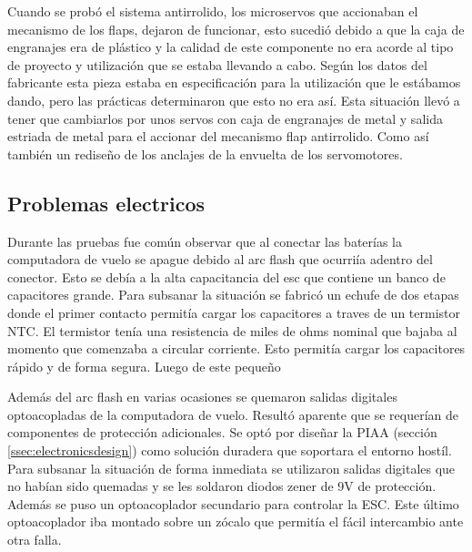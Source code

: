 \medskip

Cuando se probó el sistema antirrolido, los microservos que accionaban el mecanismo de los flaps, dejaron de funcionar, esto sucedió debido a que la caja de engranajes era de plástico y la calidad de este componente no era acorde al tipo de proyecto y utilización que se estaba llevando a cabo. Según los datos del fabricante esta pieza estaba en especificación para la utilización que le estábamos dando, pero las prácticas determinaron que esto no era así. Esta situación llevó a tener que cambiarlos por unos servos con caja de engranajes de metal y salida estriada de metal para el accionar del mecanismo flap antirrolido. Como así también un rediseño de los anclajes de la envuelta de los servomotores.

\subsection{Problemas electricos}
Durante las pruebas fue común observar que al conectar las baterías la computadora de vuelo se apague debido al arc flash que ocurriía adentro del conector. Esto se debía a la alta capacitancia
del \gls{esc} que contiene un banco de capacitores grande. Para subsanar la situación se fabricó un echufe de dos etapas donde el primer contacto permitía cargar los capacitores a traves de un termistor NTC. El termistor tenía una resistencia de miles de ohms nominal que bajaba al momento que comenzaba a circular corriente. Esto permitía cargar los capacitores rápido y de forma segura. Luego de este pequeño

Además del arc flash en varias ocasiones se quemaron salidas digitales optoacopladas de la computadora de vuelo. Resultó aparente que se requerían de componentes de protección adicionales.
Se optó por diseñar la PIAA (sección \ref{ssec:electronicsdesign}) como solución duradera que soportara el entorno hostíl. Para subsanar la situación de forma inmediata se utilizaron salidas digitales que no habían sido quemadas y se les soldaron diodos zener de 9V de protección. Además se puso un optoacoplador secundario para controlar la ESC. Este último optoacoplador iba montado sobre un zócalo que permitía el fácil intercambio ante otra falla.